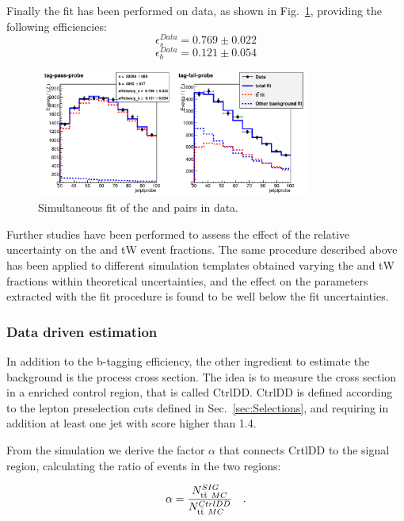 Finally the fit has been performed on data, as shown in Fig.~\ref{fig:data_tp}, providing the following efficiencies:
\begin{equation}
\epsilon_{s}^{Data}=0.769\pm0.022
\end{equation}
\begin{equation}
\epsilon_{b}^{Data}=0.121\pm0.054
\end{equation}

\begin{figure}[b]
\centering
\includegraphics[width=0.8\textwidth]{images/data_ptprobe.pdf}
\caption{Simultaneous fit of the \tpp{} and \tfp{} pairs in data.\label{fig:data_tp}}
\end{figure}

Further studies have been performed to assess the effect of the relative uncertainty on the \ttbar and tW event fractions. The same procedure described above has been applied to different simulation templates obtained varying the \ttbar and tW fractions within theoretical uncertainties, and the effect on the parameters extracted with the fit procedure is found to be well below the fit uncertainties.


\subsubsection{Data driven estimation \label{sec:DD}}
In addition to the b-tagging efficiency, the other ingredient to estimate the \ttbar background is the process cross section. The idea is to measure the cross section in a \ttbar enriched control region, that is called CtrlDD. CtrlDD is defined according to the lepton preselection cuts defined in Sec.~\ref{sec:Selections}, and requiring in addition at least one jet with \jpb score higher than 1.4.

From the simulation we derive the factor $\alpha$ that connects CrtlDD to the signal region, calculating the ratio of \ttbar events in the two regions:

\begin{equation}
\alpha=\frac{N_{\mathrm{t}\bar{\mathrm{t}}~MC}^{SIG}}{N_{\mathrm{t}\bar{\mathrm{t}}~MC}^{CtrlDD}} \quad.
\end{equation}

